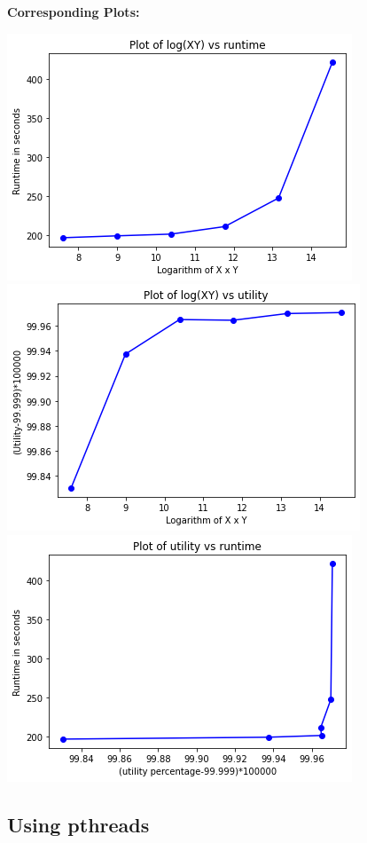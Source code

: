 \documentclass[12pt]{article}
\begin{document}
\Large\textbf{{Corresponding Plots:}}
\begin{center}
\includegraphics[scale=0.9] {resolution/xy vs runtime.png} 
\includegraphics[scale=0.9] {resolution/xy vs utility.png} 
\includegraphics[scale=0.9] {resolution/utility vs runtime.png} 
\end{center}

 
\subsection{Using pthreads}
\end{document}
